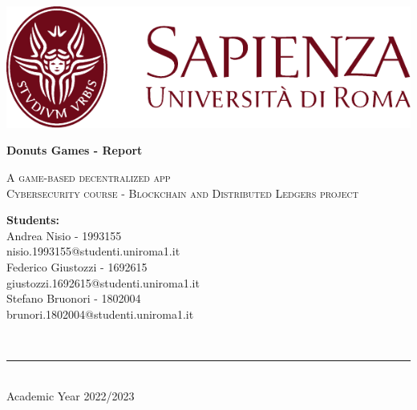\begin{titlepage}
	\centering
    \vspace*{0.5 cm}
    \includegraphics[scale = 0.75]{src/SapienzaLogo.pdf}\\[1.0 cm]	%
 
    \vspace*{2cm}

    { \fontsize{20.74pt}{18.5pt}\selectfont\bfseries Donuts Games - Report\par } %

    \vspace*{0.25cm}
    \textsc{\Large A game-based decentralized app}\\[0.5 cm] %

    \vspace*{0.75cm}
    \textsc{\large Cybersecurity course - Blockchain and Distributed Ledgers project}\\[0.5 cm] %

    \vspace*{2.8cm}
	\begin{minipage}{1.0\textwidth} %
		\begin{centering} \large
			\textbf{Students:}\\
			Andrea Nisio - 1993155\\
            nisio.1993155@studenti.uniroma1.it\\
            \vspace{5mm}
            Federico Giustozzi - 1692615\\
            giustozzi.1692615@studenti.uniroma1.it\\
            \vspace{5mm}
            Stefano Bruonori - 1802004\\
            brunori.1802004@studenti.uniroma1.it\\
                  
		\end{centering}
	\end{minipage}\\[3.2cm]

    \vspace{1cm}
    \rule{\linewidth}{0.2 mm} \\[0.3 cm]
    \vspace*{-0.2cm}
    Academic Year 2022/2023
\end{titlepage}